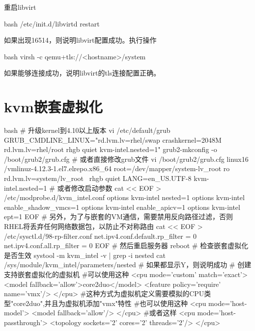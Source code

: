 重启libvirt
\begin{code-block}{bash}
/etc/init.d/libvirtd restart
\end{code-block}
如果出现16514，则说明libvirt配置成功。执行操作
\begin{code-block}{bash}
virsh -c qemu+tls://<hostname>/system
\end{code-block}
如果能够连接成功，说明libvirt的tls连接配置正确。

\section{kvm嵌套虚拟化}
\begin{code-block}{bash}
# 升级kernel到4.10以上版本
vi /etc/default/grub
GRUB_CMDLINE_LINUX="rd.lvm.lv=rhel/swap crashkernel=2048M rd.lvm.lv=rhel/root rhgb quiet kvm-intel.nested=1"
grub2-mkconfig -o /boot/grub2/grub.cfg
# 或者直接修改grub文件
vi /boot/grub2/grub.cfg
linux16 /vmlinuz-4.12.3-1.el7.elrepo.x86_64 root=/dev/mapper/system-lv_root ro rd.lvm.lv=system/lv_root \
    rhgb quiet LANG=en_US.UTF-8 kvm-intel.nested=1
# 或者修改启动参数
cat << EOF > /etc/modprobe.d/kvm_intel.conf
options kvm-intel nested=1
options kvm-intel enable_shadow_vmcs=1
options kvm-intel enable_apicv=1
options kvm-intel ept=1
EOF
# 另外，为了与嵌套的VM通信，需要禁用反向路径过滤，否则RHEL将丢弃任何网络数据包，以防止不对称路由
cat << EOF > /etc/sysctl.d/98-rp-filter.conf
net.ipv4.conf.default.rp_filter = 0
net.ipv4.conf.all.rp_filter = 0
EOF
# 然后重启服务器
reboot
# 检查嵌套虚拟化是否生效
systool -m kvm_intel -v   | grep -i nested
cat /sys/module/kvm_intel/parameters/nested
# 如果都显示Y，则说明成功
# 创建支持嵌套虚拟化的虚拟机
#可以使用这种
  <cpu mode='custom' match='exact'>
    <model fallback='allow'>core2duo</model>
    <feature policy='require' name='vmx'/>
  </cpu>
#这种方式为虚拟机定义需要模拟的CPU类型"core2duo",并且为虚拟机添加"vmx"特性
#也可以使用这种
  <cpu mode='host-model'>
    <model fallback='allow'/>
  </cpu>
#或者这样
 <cpu mode='host-passthrough'>
    <topology sockets='2' cores='2' threads='2'/>
 </cpu>
\end{code-block}

